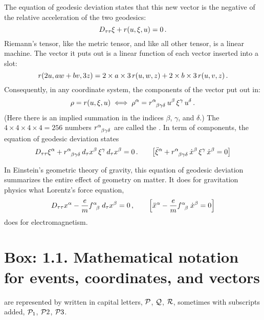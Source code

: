 The equation of geodesic deviation states that this new vector is the negative of the relative acceleration of the two geodesics:
%
\begin{equation*}
  D_{\ptime\ptime}\svec + \riemann\vat{\vel,\svec,\vel} = 0\,.
\end{equation*}
%
Riemann's tensor, like the metric tensor, and like all other tensor, is a linear machine. The vector it puts out is a linear function of each vector inserted into a slot:
%
\begin{equation*}
  \riemann\vat{2u, aw + bv, 3z} = 2\times a\times 3\,\riemann\vat{u,w,z} + 2\times b\times 3\,\riemann\vat{u,v,z}\,.
\end{equation*}
%
Consequently, in any coordinate system, the components of the vector put out in:
%
\begin{equation*}
  \rho = \riemann\vat{\vel,\svec,\vel}
  \iff
  \tvec\rho\alpha = \triemann\alpha\beta\gamma\delta\,\tvec\vel\beta\,\tvec\svec\gamma\,\tvec\vel\delta\,.
\end{equation*}
%
(Here there is an implied summation in the indices $\beta$, $\gamma$, and $\delta$.) The $4\times 4\times 4\times 4 = 256$ numbers $\triemann\alpha\beta\gamma\delta$ are called the . In term of components, the equation of geodesic deviation states
%
\begin{equation*}
  D_{\ptime\ptime}\tvec\svec\alpha + \triemann\alpha\beta\gamma\delta\,d_\ptime\tvec\pos\beta\,\tvec\svec\gamma\,d_\ptime\tvec\pos\beta = 0\,.
  \qquad
  \mleft\lbrack
    \tvec{\ddt\svec}\alpha + \triemann\alpha\beta\gamma\delta\,\tvec{\dt\pos}\beta\,\tvec\svec\gamma\,\tvec{\dt\pos}\beta = 0
  \mright\rbrack
\end{equation*}

In Einstein's geometric theory of gravity, this equation of geodesic deviation summarizes the entire effect of geometry on matter. It does for gravitation physics what Lorentz's force equation,
%
\begin{equation*}
  D_{\ptime\ptime}\tvec\pos\alpha - \dfrac{\echarge}{\mass}\tensor{\farad}{^\alpha_\beta}\,d_\ptime\tvec\pos\beta = 0\,,
  \qquad
  \mleft\lbrack
    \tvec{\ddt\pos}\alpha - \dfrac{\echarge}{\mass}\tensor{\farad}{^\alpha_\beta}\,\tvec{\dt\pos}\beta = 0
  \mright\rbrack
\end{equation*}
%
does for electromagnetism.


\section{Box: 1.1. Mathematical notation for events, coordinates, and vectors}
%
 are represented by  written in capital letters, $\event P$, $\event Q$, $\event R$, sometimes with subscripts added, $\event P_1$, $\event P2$, $\event P3$.

